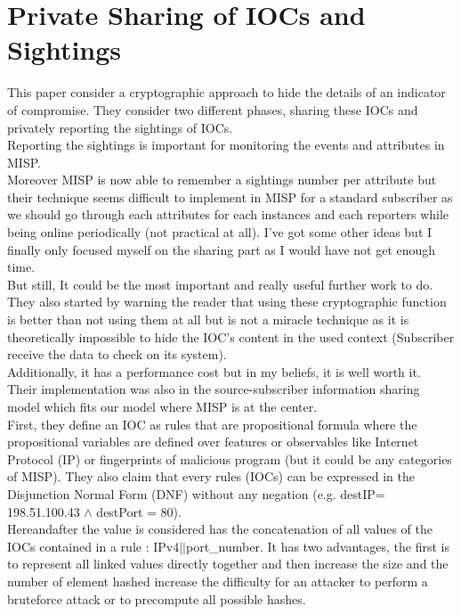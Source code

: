 \documentclass{eplmastersthesis}
\begin{document}
\section{Private Sharing of IOCs and Sightings \cite{van2016private}}
This paper consider a cryptographic approach to hide the details of an indicator of compromise. They consider two different phases, sharing these IOCs and privately reporting the sightings of IOCs.\\

Reporting the sightings is important for monitoring the events and attributes in MISP.\\ 
Moreover MISP is now able to remember a sightings number per attribute but their technique seems difficult to implement in MISP for a standard subscriber as we should go through each attributes for each instances and each reporters while being online periodically (not practical at all). I've got some other ideas but I finally only focused myself on the sharing part as I would have not get enough time.\\ 
But still, It could be the most important and really useful further work to do.\\

They also started by warning the reader that using these cryptographic function is better than not using them at all but is not a miracle technique as it is theoretically impossible to hide the IOC’s content in the used context (Subscriber receive the data to check on its system).\\
Additionally, it has a performance cost but in my beliefs, it is well worth it.\\ Their implementation was also in the source-subscriber information sharing model which fits our model where MISP is at the center.\\
First, they define an IOC as rules that are propositional formula where the propositional variables are defined over features or observables like Internet Protocol (IP) or fingerprints of malicious program (but it could be any categories of MISP). They also claim that every rules (IOCs) can be expressed in the Disjunction Normal Form (DNF) without any negation (e.g. destIP= 198.51.100.43 $\land$ destPort = 80).\\
Hereandafter the value is considered has the concatenation of all values of the IOCs contained in a rule : IPv4$||$port\_number. It has two advantages, the first is to represent all linked values directly together and then increase the size and the number of element hashed increase the difficulty for an attacker to perform a bruteforce attack or to precompute all possible hashes.\\
\end{document}
